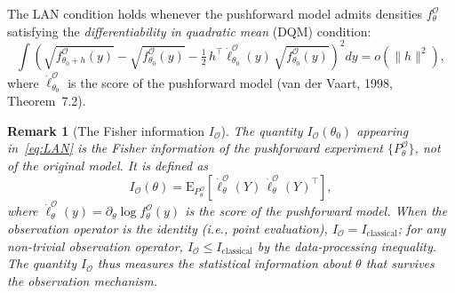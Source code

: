 \documentclass[11pt,a4paper]{article}
\newtheorem{remark}[theorem]{Remark}
\newcommand{\E}{\mathrm{E}}
\newcommand{\ie}{{i.e.}, }
\begin{document}
The LAN condition holds whenever the pushforward model admits densities $f_\theta^{\mathcal O}$ satisfying the \emph{differentiability in quadratic mean} (DQM) condition:
\[
\int \left(
\sqrt{f_{\theta_0+h}^{\mathcal O}(y)}
- \sqrt{f_{\theta_0}^{\mathcal O}(y)}
- \tfrac{1}{2}\, h^\top \dot\ell_{\theta_0}^{\mathcal O}(y)\,
  \sqrt{f_{\theta_0}^{\mathcal O}(y)}
\right)^{\!2} dy
= o(\|h\|^2),
\]
where $\dot\ell_{\theta_0}^{\mathcal O}$ is the score of the pushforward model (van der Vaart, 1998, Theorem~7.2).

\begin{remark}[The Fisher information $I_{\mathcal O}$]\label{rem:IO-definition}
The quantity $I_{\mathcal O}(\theta_0)$ appearing in~\eqref{eq:LAN}
is the Fisher information of the \emph{pushforward experiment}
$\{P_\theta^{\mathcal O}\}$, not of the original model.  It is defined as
\[
I_{\mathcal O}(\theta)
= \E_{P_\theta^{\mathcal O}}\!\left[
\dot\ell_\theta^{\mathcal O}(Y)\,
\dot\ell_\theta^{\mathcal O}(Y)^\top
\right],
\]
where $\dot\ell_\theta^{\mathcal O}(y) = \partial_\theta \log
f_\theta^{\mathcal O}(y)$ is the score of the pushforward model.  When the
observation operator is the identity (\ie point evaluation),
$I_{\mathcal O} = I_{\mathrm{classical}}$; for any non-trivial observation
operator, $I_{\mathcal O} \leq I_{\mathrm{classical}}$ by the
data-processing inequality.  The quantity $I_{\mathcal O}$ thus measures
the statistical information about $\theta$ that survives the observation
mechanism.
\end{remark}
\end{document}

